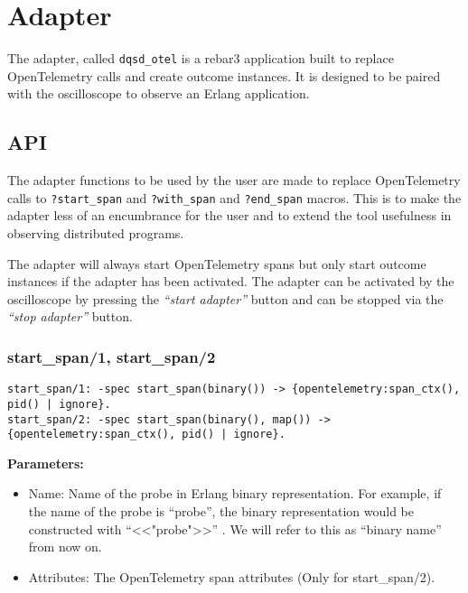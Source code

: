 \section{Adapter}
    The adapter, called \texttt{dqsd\_otel} is a rebar3 \cite{rebar3} application built to replace OpenTelemetry calls and create outcome instances. It is designed to be paired with the oscilloscope to observe an Erlang application.
    
    \subsection{API}
        The adapter functions to be used by the user are made to replace OpenTelemetry calls to \texttt{?start\_span} and \texttt{?with\_span} and \texttt{?end\_span} macros. This is to make the adapter less of an encumbrance for the user and to extend the tool usefulness in observing distributed programs. 

        The adapter will always start OpenTelemetry spans but only start outcome instances if the adapter has been activated. The adapter can be activated by the oscilloscope by pressing the \textit{``start adapter''} button and can be stopped via the \textit{``stop adapter''} button.
         
        \subsubsection{start\_span/1, start\_span/2}
        
        \begin{verbatim}        
start_span/1: -spec start_span(binary()) -> {opentelemetry:span_ctx(), pid() | ignore}.
start_span/2: -spec start_span(binary(), map()) -> {opentelemetry:span_ctx(), pid() | ignore}.  
        \end{verbatim}
        
        \textbf{Parameters:}
        \begin{itemize}
            \item Name: Name of the probe in Erlang binary representation. For example, if the name of the probe is ``probe'', the binary representation would be constructed with ``<<"probe">>'' \cite{bin-erl} \cite{bit-syntax}. We will refer to this as ``binary name'' from now on.
            \item Attributes: The OpenTelemetry span attributes (Only for start\_span/2).
        \end{itemize} 
        
